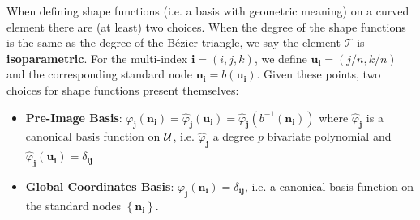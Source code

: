 When defining shape functions (i.e. a basis with geometric meaning) on a
curved element there are (at least) two choices. When the degree of the
shape functions is the same as the degree of the B\'{e}zier triangle,
we say the element \(\mathcal{T}\) is \textbf{isoparametric}.
For the multi-index
\(\mathbf{i} = (i, j , k)\), we define \(\mathbf{u}_{\mathbf{i}} =
\left(j/n, k/n\right)\) and the corresponding standard node
\(\mathbf{n}_{\mathbf{i}} = b\left(\mathbf{u}_{\mathbf{i}}\right)\).
Given these points, two choices for shape functions present
themselves:
\begin{itemize}
  \item \textbf{Pre-Image Basis}:
    \(\varphi_{\mathbf{j}}\left(\mathbf{n}_{\mathbf{i}}\right) =
      \widehat{\varphi}_{\mathbf{j}}\left(\mathbf{u}_{\mathbf{i}}\right) =
      \widehat{\varphi}_{\mathbf{j}}\left(b^{-1}\left(
      \mathbf{n}_{\mathbf{i}}\right)\right)\)
    where \(\widehat{\varphi}_{\mathbf{j}}\) is a canonical basis function
    on \(\mathcal{U}\), i.e.
    \(\widehat{\varphi}_{\mathbf{j}}\) a degree \(p\) bivariate polynomial and
    \(\widehat{\varphi}_{\mathbf{j}}\left(\mathbf{u}_{\mathbf{i}}\right) =
    \delta_{\mathbf{i} \mathbf{j}}\)
  \item \textbf{Global Coordinates Basis}:
    \(\varphi_{\mathbf{j}}\left(\mathbf{n}_{\mathbf{i}}\right) =
    \delta_{\mathbf{i} \mathbf{j}}\), i.e. a canonical basis function
    on the standard nodes \(\left\{\mathbf{n}_{\mathbf{i}}\right\}\).
\end{itemize}

